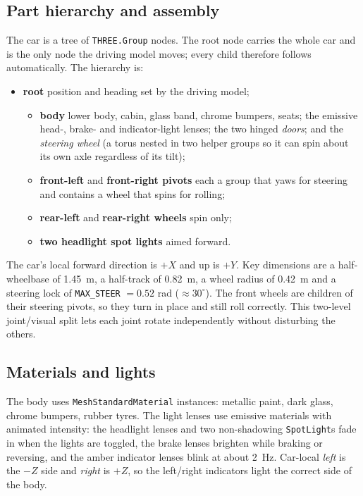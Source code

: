 \documentclass[11pt]{article}
\newcommand{\code}[1]{\texttt{#1}}
\begin{document}
\subsection{Part hierarchy and assembly}

The car is a tree of \code{THREE.Group} nodes. The root node carries the whole
car and is the only node the driving model moves; every child therefore follows
automatically. The hierarchy is:

\begin{itemize}
  \item \textbf{root} \textemdash{} position and heading set by the driving model;
  \begin{itemize}
    \item \textbf{body} \textemdash{} lower body, cabin, glass band, chrome
      bumpers, seats; the emissive head-, brake- and indicator-light lenses; the
      two hinged \emph{doors}; and the \emph{steering wheel} (a torus nested in
      two helper groups so it can spin about its own axle regardless of its tilt);
    \item \textbf{front-left} and \textbf{front-right pivots} \textemdash{} each a
      group that yaws for steering and contains a wheel that spins for rolling;
    \item \textbf{rear-left} and \textbf{rear-right wheels} \textemdash{} spin only;
    \item \textbf{two headlight spot lights} aimed forward.
  \end{itemize}
\end{itemize}

The car's local forward direction is $+X$ and up is $+Y$. Key dimensions are a
half-wheelbase of \SI{1.45}{m}, a half-track of \SI{0.82}{m}, a wheel radius of
\SI{0.42}{m} and a steering lock of \code{MAX\_STEER} $= 0.52$ rad ($\approx
30^\circ$). The front wheels are children of their steering pivots, so they turn
in place and still roll correctly. This two-level joint/visual split lets each
joint rotate independently without disturbing the others.

\subsection{Materials and lights}

The body uses \code{MeshStandardMaterial} instances: metallic paint, dark glass,
chrome bumpers, rubber tyres. The light lenses use emissive materials with
animated intensity: the headlight lenses and two non-shadowing
\code{SpotLight}s fade in when the lights are toggled, the brake lenses
brighten while braking or reversing, and the amber indicator lenses blink at
about \SI{2}{Hz}. Car-local \emph{left} is the $-Z$ side and \emph{right} is
$+Z$, so the left/right indicators light the correct side of the body.
\end{document}
